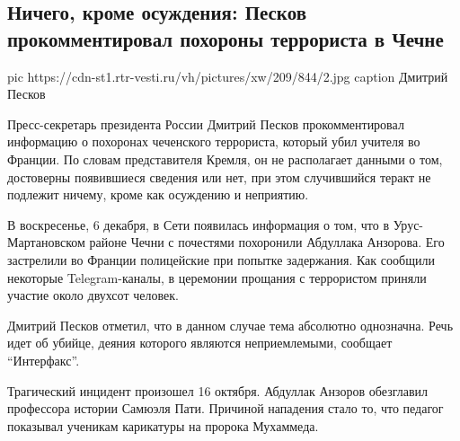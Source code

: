  
 
 
 
 
 
\subsection{Ничего, кроме осуждения: Песков прокомментировал похороны террориста в Чечне}
\label{sec:07_12_2020.news.ru.vesti.1.peskov_comment_paris_terrorist}

\ifcmt
  pic https://cdn-st1.rtr-vesti.ru/vh/pictures/xw/209/844/2.jpg
  caption Дмитрий Песков
\fi


Пресс-секретарь президента России Дмитрий Песков прокомментировал информацию о
похоронах чеченского террориста, который убил учителя во Франции. По словам
представителя Кремля, он не располагает данными о том, достоверны появившиеся
сведения или нет, при этом случившийся теракт не подлежит ничему, кроме как
осуждению и неприятию.

В воскресенье, 6 декабря, в Сети появилась информация о том, что в
Урус-Мартановском районе Чечни с почестями похоронили Абдуллака Анзорова. Его
застрелили во Франции полицейские при попытке задержания. Как сообщили
некоторые Telegram-каналы, в церемонии прощания с террористом приняли участие
около двухсот человек.

Дмитрий Песков отметил, что в данном случае тема абсолютно однозначна. Речь
идет об убийце, деяния которого являются неприемлемыми, сообщает \enquote{Интерфакс}.

Трагический инцидент произошел 16 октября. Абдуллак Анзоров обезглавил
профессора истории Самюэля Пати. Причиной нападения стало то, что педагог
показывал ученикам карикатуры на пророка Мухаммеда.
